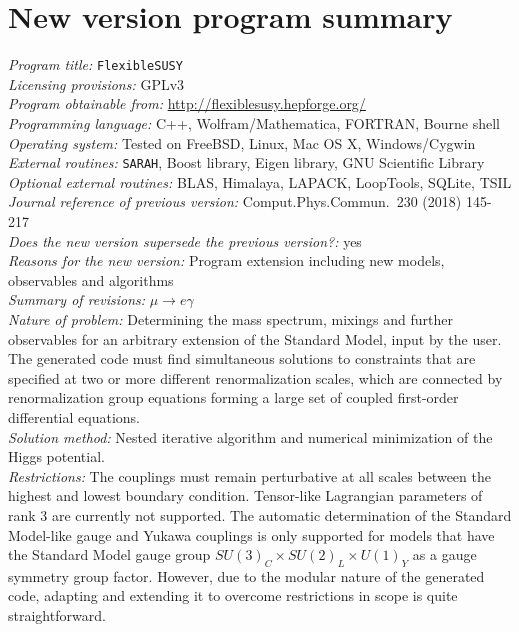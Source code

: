 \documentclass[final,3p,11pt,pdflatex]{elsarticle}
\makeatletter
\newcommand{\sarah}{\texttt{SARAH}\@\xspace}
\newcommand{\fs}{\texttt{FlexibleSUSY}\@\xspace}
\makeatother
\begin{document}
\clearpage
{}
\section*{New version program summary}
\noindent
{\em Program title:} \fs\\[0.5em]
{\em Licensing provisions:} GPLv3\\[0.5em]
{\em Program obtainable from:} \url{http://flexiblesusy.hepforge.org/}\\[0.5em]
{\em Programming language:} C++, Wolfram/Mathematica, FORTRAN, Bourne shell\\[0.5em]
{\em Operating system:} Tested on FreeBSD, Linux, Mac OS X, Windows/Cygwin\\[0.5em]
{\em External routines:} \sarah, Boost library, Eigen library, GNU Scientific Library\\[0.5em]
{\em Optional external routines:} BLAS, Himalaya, LAPACK, LoopTools, SQLite, TSIL\\[0.5em]
{\em Journal reference of previous version:} Comput.Phys.Commun.\ 230 (2018) 145-217\\[0.5em]
{\em Does the new version supersede the previous version?:} yes \\[0.5em]
{\em Reasons for the new version:} Program extension including new models, observables and algorithms\\[0.5em]
{\em Summary of revisions:} $\mu\to e\gamma$\\[0.5em]
{\em Nature of problem:}
%
Determining the mass spectrum, mixings and further observables for an
arbitrary extension of the Standard Model, input by the user. The
generated code must find simultaneous solutions to constraints that
are specified at two or more different renormalization scales, which
are connected by renormalization group equations forming a large set
of coupled first-order differential
equations. \\[0.5em]
%
{\em Solution method:}
%
Nested iterative algorithm and numerical
minimization of the Higgs potential.\\[0.5em]
%
{\em Restrictions:}
%
The couplings must remain perturbative at all scales between the
highest and lowest boundary condition.  Tensor-like Lagrangian
parameters of rank 3 are currently not supported.  The automatic
determination of the Standard Model-like gauge and Yukawa couplings is
only supported for models that have the Standard Model gauge group
$SU(3)_C\times SU(2)_L\times U(1)_Y$ as a gauge symmetry group factor.
However, due to the modular nature of the generated code, adapting and
extending it to overcome restrictions in scope is quite straightforward.
\end{document}
